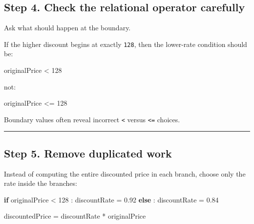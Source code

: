 \documentclass[
  11pt,
  a4paper,
]{article}
\newenvironment{Shaded}{}{}
\newcommand{\ControlFlowTok}[1]{\textcolor[rgb]{0.00,0.44,0.13}{\textbf{#1}}}
\newcommand{\DecValTok}[1]{\textcolor[rgb]{0.25,0.63,0.44}{#1}}
\newcommand{\FloatTok}[1]{\textcolor[rgb]{0.25,0.63,0.44}{#1}}
\newcommand{\NormalTok}[1]{#1}
\newcommand{\OperatorTok}[1]{\textcolor[rgb]{0.40,0.40,0.40}{#1}}
\begin{document}
\subsection{Step 4. Check the relational operator
carefully}\label{step-4.-check-the-relational-operator-carefully}

Ask what should happen at the boundary.

If the higher discount begins at exactly \texttt{128}, then the
lower-rate condition should be:

\begin{Shaded}
\begin{Highlighting}[]
\NormalTok{originalPrice }\OperatorTok{\textless{}} \DecValTok{128}
\end{Highlighting}
\end{Shaded}

not:

\begin{Shaded}
\begin{Highlighting}[]
\NormalTok{originalPrice }\OperatorTok{\textless{}=} \DecValTok{128}
\end{Highlighting}
\end{Shaded}

Boundary values often reveal incorrect \texttt{\textless{}} versus
\texttt{\textless{}=} choices.

\begin{center}\rule{0.5\linewidth}{0.5pt}\end{center}

\subsection{Step 5. Remove duplicated
work}\label{step-5.-remove-duplicated-work}

Instead of computing the entire discounted price in each branch, choose
only the rate inside the branches:

\begin{Shaded}
\begin{Highlighting}[]
\ControlFlowTok{if}\NormalTok{ originalPrice }\OperatorTok{\textless{}} \DecValTok{128}\NormalTok{ :}
\NormalTok{    discountRate }\OperatorTok{=} \FloatTok{0.92}
\ControlFlowTok{else}\NormalTok{ :}
\NormalTok{    discountRate }\OperatorTok{=} \FloatTok{0.84}

\NormalTok{discountedPrice }\OperatorTok{=}\NormalTok{ discountRate }\OperatorTok{*}\NormalTok{ originalPrice}
\end{Highlighting}
\end{Shaded}
\end{document}
